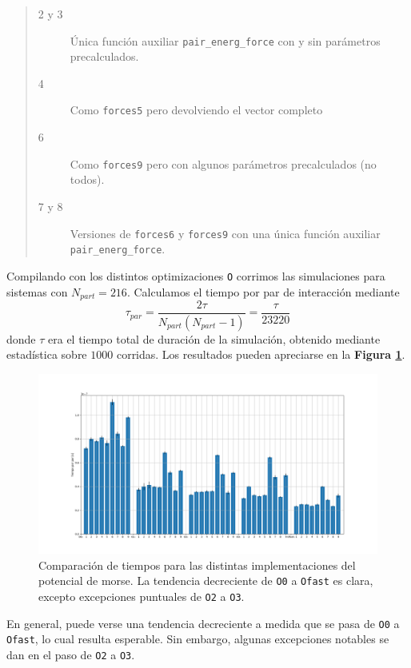 \documentclass[twoside, 12pt]{article}
\begin{document}
\begin{quote}
\begin{description}
\item[2 y 3] Única función auxiliar \texttt{pair\_energ\_force} con y sin parámetros precalculados.
\item[4] Como \texttt{forces5} pero devolviendo el vector completo
\item[6] Como \texttt{forces9} pero con algunos parámetros precalculados (no todos).
\item[7 y 8] Versiones de \texttt{forces6} y \texttt{forces9} con una única función auxiliar \texttt{pair\_energ\_force}.
\end{description}
\end{quote}

Compilando con los distintos optimizaciones \texttt{O} corrimos las simulaciones para sistemas con $N_{part}=216$. Calculamos el tiempo por par de interacci\'on mediante 
\[ \tau_{par}=\frac{2\tau}{N_{part}(N_{part}-1)} =\frac{\tau}{23220} \]
donde $\tau$ era el tiempo total de duraci\'on de la simulaci\'on, obtenido mediante estad\'istica sobre $1000$ corridas. Los resultados pueden apreciarse en la \textbf{Figura \ref{fig:CompTodas}}.

\begin{figure}[h]
	\centering
	\includegraphics[trim = 40mm 20mm 40mm 20mm, clip, width=\columnwidth]{Comp_tiempos_morse_todos.png}
	\caption{Comparación de tiempos para las distintas implementaciones del potencial de morse. La tendencia decreciente de \texttt{O0} a \texttt{Ofast} es clara, excepto excepciones puntuales de \texttt{O2} a \texttt{O3}.}
	\label{fig:CompTodas}
\end{figure}

En general, puede verse una tendencia decreciente a medida que se pasa de \texttt{O0} a \texttt{Ofast}, lo cual resulta esperable. Sin embargo, algunas excepciones notables se dan en el paso de \texttt{O2} a \texttt{O3}.
\end{document}

